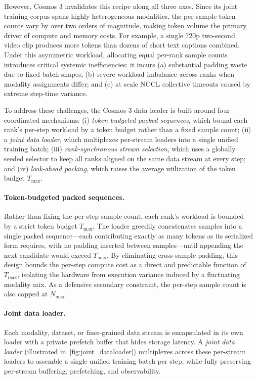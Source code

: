 However, Cosmos 3 invalidates this recipe along all three axes. Since its joint training corpus spans highly heterogeneous modalities, the per-sample token counts vary by over two orders of magnitude, making token volume the primary driver of compute and memory costs. For example, a single 720p two-second video clip produces more tokens than dozens of short text captions combined. Under this asymmetric workload, allocating equal per-rank sample counts introduces critical systemic inefficiencies: it incurs (a) substantial padding waste due to fixed batch shapes; (b) severe workload imbalance across ranks when modality assignments differ; and (c) at scale NCCL collective timeouts caused by extreme step-time variance.

To address these challenges, the Cosmos 3 data loader is built around four coordinated mechanisms:
(i) \emph{token-budgeted packed sequences}, which bound each rank's per-step workload by a token budget rather than a fixed sample count;
(ii) a \emph{joint data loader}, which multiplexes per-stream loaders into a single unified training batch;
(iii) \emph{rank-synchronous stream selection}, which uses a globally seeded selector to keep all ranks aligned on the same data stream at every step;
and (iv) \emph{look-ahead packing}, which raises the average utilization of the token budget $T_{\max}$.

\paragraph{Token-budgeted packed sequences.}
Rather than fixing the per-step sample count, each rank's workload is bounded by a strict token budget $T_{\max}$. The loader greedily concatenates samples into a single packed sequence---each contributing exactly as many tokens as its serialized form requires, with no padding inserted between samples---until appending the next candidate would exceed $T_{\max}$. By eliminating cross-sample padding, this design bounds the per-step compute cost as a direct and predictable function of $T_{\max}$, isolating the hardware from execution variance induced by a fluctuating modality mix. As a defensive secondary constraint, the per-step sample count is also capped at $N_{\max}$.

\paragraph{Joint data loader.}
Each modality, dataset, or finer-grained data stream is encapsulated in its own loader with a private prefetch buffer that hides storage latency. A \emph{joint data loader} (illustrated in~\cref{fig:joint_dataloader}) multiplexes across these per-stream loaders to assemble a single unified training batch per step, while fully preserving per-stream buffering, prefetching, and observability.

